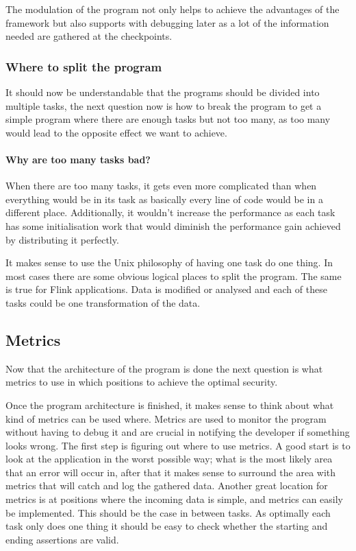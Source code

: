 The modulation of the program not only helps to achieve the advantages of the framework but also supports with debugging later as a lot of the information needed are gathered at the checkpoints.

\subsubsection{Where to split the program}
It should now be understandable that the programs should be divided into multiple tasks, the next question now is how to break the program to get a simple program where there are enough tasks but not too many, as too many would lead to the opposite effect we want to achieve.

\paragraph{Why are too many tasks bad?} When there are too many tasks, it gets even more complicated than when everything would be in its task as basically every line of code would be in a different place. Additionally, it wouldn't increase the performance as each task has some initialisation work that would diminish the performance gain achieved by distributing it perfectly.

It makes sense to use the Unix philosophy of having one task do one thing. In most cases there are some obvious logical places to split the program. The same is true for Flink applications. Data is modified or analysed and each of these tasks could be one transformation of the data.

\pagebreak

\subsection{Metrics}
Now that the architecture of the program is done the next question is what metrics to use in which positions to achieve the optimal security.

Once the program architecture is finished, it makes sense to think about what kind of metrics can be used where. Metrics are used to monitor the program without having to debug it and are crucial in notifying the developer if something looks wrong. The first step is figuring out where to use metrics. A good start is to look at the application in the worst possible way; what is the most likely area that an error will occur in, after that it makes sense to surround the area with metrics that will catch and log the gathered data. Another great location for metrics is at positions where the incoming data is simple, and metrics can easily be implemented. This should be the case in between tasks. As optimally each task only does one thing it should be easy to check whether the starting and ending assertions are valid.

